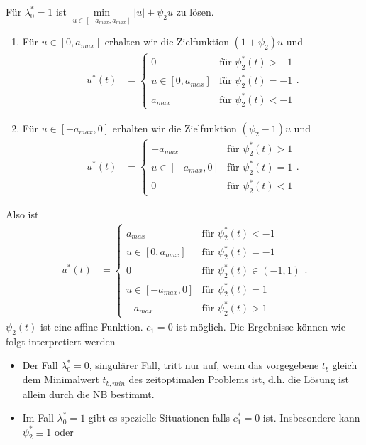 \begin{exmp}
Für $\lambda_0^{\ast}=1$ ist $\min\limits_{u\in[-a_{max},a_{max}]}|u|+\psi_2 u$ zu lösen.
\begin{enumerate}
  \item Für $u\in[0,a_{max}]$ erhalten wir die Zielfunktion $(1+\psi_2)u$ und
  \begin{align*}
  	u^{\ast}(t) & = \left\{\begin{array}{cl}
  	0 & \text{für }\psi_2^{\ast}(t) > -1\\
	u\in[0,a_{max}] & \text{für }\psi_2^{\ast}(t) = -1\\
	a_{max} & \text{für }\psi_2^{\ast}(t) < -1
  	\end{array} \right. .
  \end{align*}
  \item Für $u\in[-a_{max},0]$ erhalten wir die Zielfunktion $(\psi_2-1)u$ und
  \begin{align*}
  u^{\ast}(t) & = \left\{\begin{array}{cl}
  	-a_{max} & \text{für }\psi_2^{\ast}(t) > 1\\
	u\in[-a_{max},0] & \text{für }\psi_2^{\ast}(t) = 1\\
	0 & \text{für }\psi_2^{\ast}(t) < 1
  \end{array} \right. .
  \end{align*}
\end{enumerate}
Also ist 
\begin{align}
u^{\ast}(t) & = \left\{\begin{array}{cl}
a_{max} & \text{für }\psi_2^{\ast}(t) < -1\\
u\in[0,a_{max}] & \text{für }\psi_2^{\ast}(t) = -1\\
0 & \text{für }\psi_2^{\ast}(t) \in(-1,1)\\
u\in[-a_{max},0] & \text{für }\psi_2^{\ast}(t) = 1\\
-a_{max} & \text{für }\psi_2^{\ast}(t) > 1
\end{array} \right. . \label{eqn:kap_2_verbrau_opt_u}
\end{align}
$\psi_2(t)$ ist eine affine Funktion. $c_1=0$ ist möglich. Die Ergebnisse können wie folgt interpretiert werden
\begin{itemize}
  \item Der Fall $\lambda_0^{\ast}=0$, singulärer Fall, tritt nur auf, wenn das vorgegebene $t_b$ gleich dem Minimalwert $t_{b,min}$ des zeitoptimalen
  Problems ist, d.h. die Lösung ist allein durch die \ac{NB} bestimmt.  
  \item Im Fall $\lambda_0^{\ast}=1$ gibt es spezielle Situationen falls $c_1^{\ast}=0$ ist. Insbesondere kann $\psi_2^{\ast}\equiv 1$ oder

\end{itemize}
\end{exmp}
